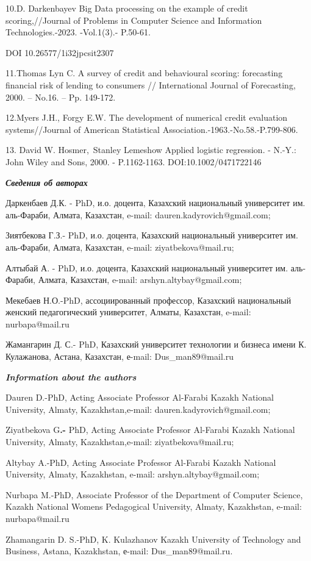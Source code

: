 10.D. Darkenbayev Big Data processing on the example of credit
scoring,//Journal of Problems in Computer Science and Information
Technologies.-2023. -Vol.1(3).- P.50-61.

DOI 10.26577/1i32jpcsit2307

11.Thomas Lyn C. A survey of credit and behavioural scoring: forecasting
financial risk of lending to consumers // International Journal of
Forecasting, 2000. -- No.16. -- Pp. 149-172.

12.Myers J.H., Forgy E.W. The development of numerical credit evaluation
systems//Journal of American Statistical
Association.-1963.-No.58.-P.799-806.

13. David W. Hosmer,~Stanley Lemeshow Applied logistic regression. -
N.-Y.: John Wiley and Sons, 2000. - P.1162-1163. DOI:10.1002/0471722146

\emph{{\bfseries Сведения об авторах}}

Даркенбаев Д.К. - PhD, и.о. доцента, Казахский национальный университет
им. аль-Фараби, Алмата, Казахстан, e-mail: dauren.kadyrovich@gmail.com;

Зиятбекова Г.З.- PhD, и.о. доцента, Казахский национальный университет
им. аль-Фараби, Алмата, Казахстан, e-mail: ziyatbekova@mail.ru;

Алтыбай А. - PhD, и.о. доцента, Казахский национальный университет им.
аль-Фараби, Алмата, Казахстан, e-mail: arshyn.altybay@gmail.com;

Мекебаев Н.О.-PhD, ассоциированный профессор, Казахский национальный
женский педагогический университет, Алматы, Казахстан, e-mail:
nurbapa@mail.ru

Жамангарин Д. С.- PhD, Казахский университет технологии и бизнеса имени
К. Кулажанова, Астана, Казахстан, е-mail: Dus\_man89@mail.ru

\emph{{\bfseries Information about the authors}}

Dauren D.-PhD, Acting Associate Professor Al-Farabi Kazakh National
University, Almaty, Kazakhstan,e-mail: dauren.kadyrovich@gmail.com;

Ziyatbekova G{\bfseries .-} PhD, Acting Associate Professor Al-Farabi
Kazakh National University, Almaty, Kazakhstan,e-mail:
ziyatbekova@mail.ru;

Altybay A.-PhD, Acting Associate Professor Al-Farabi Kazakh National
University, Almaty, Kazakhstan, e-mail: arshyn.altybay@gmail.com;

Nurbapa M.-PhD, Associate Professor of the Department of Computer
Science, Kazakh National Women\textquotesingle s Pedagogical University,
Almaty, Kazakhstan, e-mail: nurbapa@mail.ru

Zhamangarin D. S.-PhD, K. Kulazhanov Kazakh University of Technology and
Business, Astana, Kazakhstan, е-mail: Dus\_man89@mail.ru.\newpage

